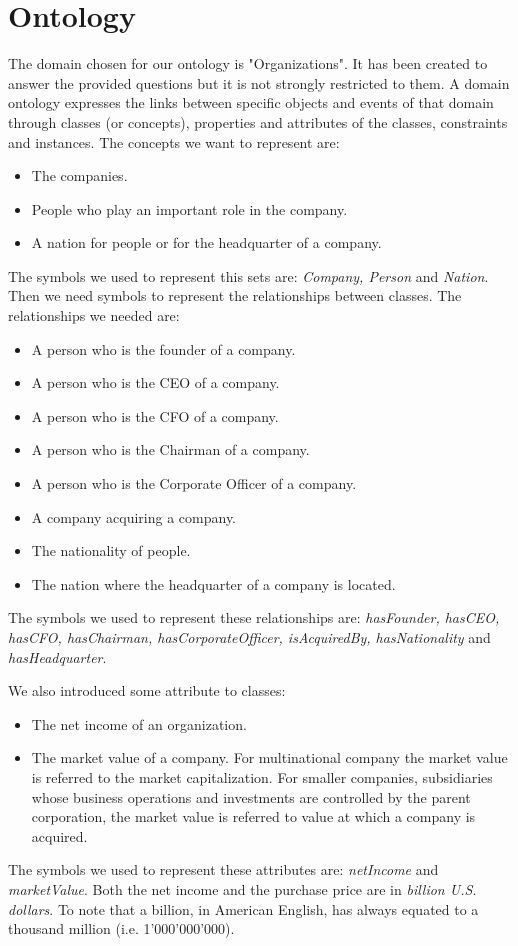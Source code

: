 \section{Ontology}
\label{sec:ontology}
The domain chosen for our ontology is "Organizations". It has been created to answer the provided questions but it is not strongly restricted to them. A domain ontology expresses the links between specific objects and events of that domain through classes (or concepts), properties and attributes of the classes, constraints and instances.
The concepts we want to represent are:
\begin{itemize}
\item The companies.
\item People who play an important role in the company.
\item A nation for people or for the headquarter of a company.
\end{itemize}
The symbols we used to represent this sets are: \textit{Company, Person} and \textit{Nation}.
Then we need symbols to represent the relationships between classes. The relationships we needed are:
\begin{itemize}
\item A person who is the founder of a company.
\item A person who is the CEO of a company.
\item A person who is the CFO of a company.
\item A person who is the Chairman of a company.
\item A person who is the Corporate Officer of a company.
\item A company acquiring a company.
\item The nationality of people.
\item The nation where the headquarter of a company is located.
\end{itemize}
The symbols we used to represent these relationships are: \textit{hasFounder, hasCEO, hasCFO, hasChairman, hasCorporateOfficer, isAcquiredBy, hasNationality} and \textit{hasHeadquarter}. 

We also introduced some attribute to classes:
\begin{itemize}
\item The net income of an organization.
\item The market value of a company. For multinational company the market value is referred to the market capitalization. For smaller companies, subsidiaries whose business operations and investments are controlled by the parent corporation, the market value is referred to value at which a company is acquired.
\end{itemize}
The symbols we used to represent these attributes are: \textit{ netIncome} and \textit{marketValue}.
Both the net income and the purchase price are in \textit{billion U.S. dollars}. To note that a billion, in American English, has always equated to a thousand million (i.e. 1'000'000'000).

